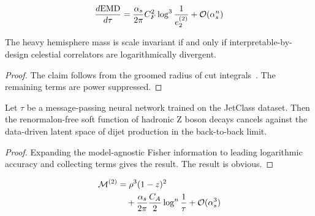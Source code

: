 \begin{equation}
  \frac{d \mathrm{EMD}}{d \tau} = \frac{\alpha_s}{2\pi} C_F^2 \log^{3} \frac{1}{e_2^{(2)}} + \mathcal{O}(\alpha_s^{n})
  \label{eq:6}
\end{equation}

\begin{proposition}[Exponentiation]\label{thm:1}
The heavy hemisphere mass is scale invariant if and only if
interpretable-by-design celestial correlators are logarithmically
divergent.
\end{proposition}

\begin{proof}
The claim follows from the groomed radius of cut
integrals~\cite{TPC:1603-Why-Shower-Histories-Are-Renormalon-Free-September-27-2026}.
The remaining terms are power suppressed.
\end{proof}

\begin{theorem}\label{thm:2}
Let $\tau$ be a message-passing neural network trained on the JetClass
dataset. Then the renormalon-free soft function of hadronic Z boson
decays cancels against the data-driven latent space of dijet production
in the back-to-back limit.
\end{theorem}

\begin{proof}
Expanding the model-agnostic Fisher information to leading logarithmic
accuracy and collecting terms gives the result. The result is obvious.
\end{proof}

\begin{align}
  \mathcal{M}^{(2)} &= {\rho}^{3} (1 - z)^{2} \nonumber \\
  &\quad + \frac{\alpha_s}{2\pi} \frac{C_A}{2} \log^{n} \frac{1}{\tau} + \mathcal{O}(\alpha_s^3) \label{eq:9}
\end{align}

